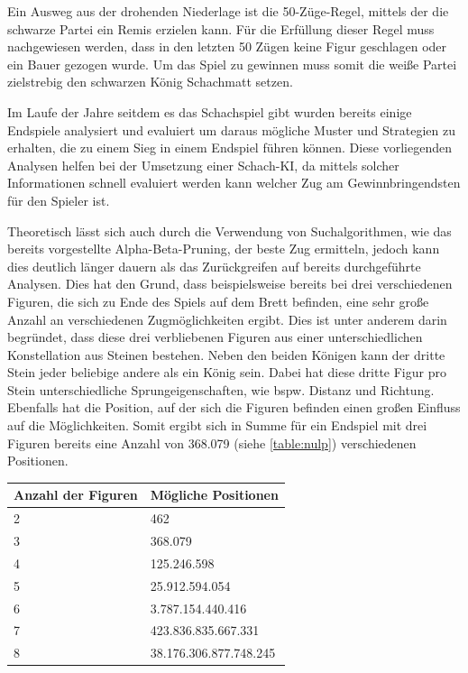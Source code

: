 Ein Ausweg aus der drohenden Niederlage ist die 50-Züge-Regel, mittels der die schwarze Partei ein Remis erzielen kann. Für die Erfüllung dieser Regel muss nachgewiesen werden, dass in den letzten 50 Zügen keine Figur geschlagen oder ein Bauer gezogen wurde.\cite{Alt2018} Um das Spiel zu gewinnen muss somit die weiße Partei zielstrebig den schwarzen König Schachmatt setzen.


Im Laufe der Jahre seitdem es das Schachspiel gibt wurden bereits einige Endspiele analysiert und evaluiert um daraus mögliche Muster und Strategien zu erhalten, die zu einem Sieg in einem Endspiel führen können. Diese vorliegenden Analysen helfen bei der Umsetzung einer Schach-KI, da mittels solcher Informationen schnell evaluiert werden kann welcher Zug am Gewinnbringendsten für den Spieler ist. 

Theoretisch lässt sich auch durch die Verwendung von Suchalgorithmen, wie das bereits vorgestellte Alpha-Beta-Pruning, der beste Zug ermitteln, jedoch kann dies deutlich länger dauern als das Zurückgreifen auf bereits durchgeführte Analysen. Dies hat den Grund, dass beispielsweise bereits bei drei verschiedenen Figuren, die sich zu Ende des Spiels auf dem Brett befinden, eine sehr große Anzahl an verschiedenen Zugmöglichkeiten ergibt. Dies ist unter anderem darin begründet, dass diese drei verbliebenen Figuren aus einer unterschiedlichen Konstellation aus Steinen bestehen. Neben den beiden Königen kann der dritte Stein jeder beliebige andere als ein König sein. Dabei hat diese dritte Figur pro Stein unterschiedliche Sprungeigenschaften, wie bspw. Distanz und Richtung. Ebenfalls hat die Position, auf der sich die Figuren befinden einen großen Einfluss auf die Möglichkeiten. Somit ergibt sich in Summe für ein Endspiel mit drei Figuren bereits eine Anzahl von 368.079 (siehe \ref{table:nulp}) verschiedenen Positionen.

\begin{center}
\begin{tabular}{| p{5cm} | p{5cm} |}
\hline
\textbf{Anzahl der Figuren} & \textbf{Mögliche Positionen}\\ \hline
2 & 462\\ \hline
3 & 368.079\\ \hline
4 & 125.246.598\\ \hline
5 & 25.912.594.054\\ \hline
6 & 3.787.154.440.416\\ \hline
7 & 423.836.835.667.331\\ \hline
8 & 38.176.306.877.748.245 \cite{Kryukov2014}\\
\hline
\end{tabular}
\label{table:nulp}
\end{center}

